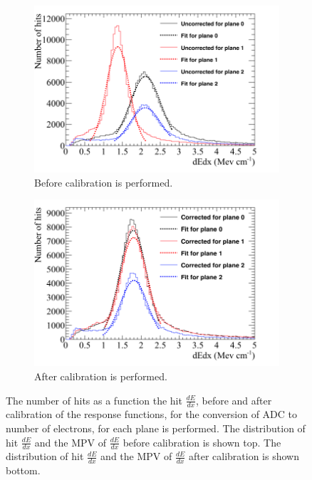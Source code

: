 \begin{figure}[h!]
  \centering
  \begin{subfigure}{0.6\textwidth}
    \centering
    \includegraphics[width=\textwidth]{UnCorrectedCanvas}
    \caption{Before calibration is performed.}
    \label{fig:CaloTune_Before}
  \end{subfigure}
  \begin{subfigure}{0.6\textwidth}
    \centering
    \includegraphics[width=\textwidth]{CorrectedCanvas}
    \caption{After calibration is performed.}
    \label{fig:CaloTune_After}
  \end{subfigure}
  \caption[The calibration of the calorimetric constants in the 35 ton]
          {The number of hits as a function the hit $\frac{dE}{dx}$, before and after calibration of the response functions, for the conversion of ADC to number of electrons, for each plane is performed. The distribution of hit $\frac{dE}{dx}$ and the MPV of $\frac{dE}{dx}$ before calibration is shown top. The distribution of hit $\frac{dE}{dx}$ and the MPV of $\frac{dE}{dx}$ after calibration is shown bottom.}
          \label{fig:CaloTune}
\end{figure}
        
